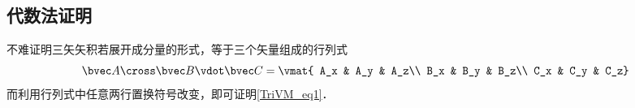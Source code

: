 \subsection{代数法证明}
不难证明三矢矢积若展开成分量的形式，等于三个矢量组成的行列式
\begin{equation}
\bvec A \cross \bvec B \vdot \bvec C = \vmat{
A_x & A_y & A_z\\
B_x & B_y & B_z\\
C_x & C_y & C_z}
\end{equation}
而利用行列式中任意两行置换符号改变，即可证明\autoref{TriVM_eq1}．


